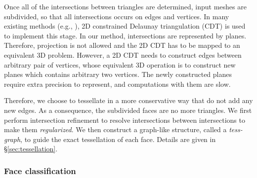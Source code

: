 
Once all of the intersections between triangles are determined, input meshes are subdivided, so that all intersections occurs on edges and vertices. In many existing methods (e.g., \cite{ogayar2015deferred,zhou2016mesh}), 2D constrained Delaunay triangulation (CDT) \cite{chew1989constrained}\cite{de1992line} is used to implement this stage. In our method, intersections are represented by planes. Therefore, projection is not allowed and the 2D CDT has to be mapped to an equivalent 3D problem. However, a 2D CDT needs to construct edges between arbitrary pair of vertices, whose equivalent 3D operation is to construct new planes which contains arbitrary two vertices. The newly constructed planes require extra precision to represent, and computations with them are slow.

Therefore, we choose to tessellate in a more conservative way that do not add any new edges. As a consequence, the subdivided faces are no more triangles. We first perform intersection refinement to resolve intersections between intersections to make them \emph{regularized}. We then construct a graph-like structure, called a \emph{tess-graph}, to guide the exact tessellation of each face. Details are given in \S\ref{sec:tessellation}.

\subsubsection{Face classification}

